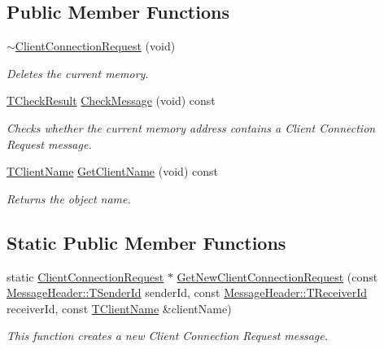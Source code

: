 \subsection*{Public Member Functions}
\begin{DoxyCompactItemize}
\item 
\hyperlink{class_terra_swarm_1_1_asynchronous_1_1_client_connection_request_a610c90a4ff7b849f86c2ddc962ba1c85}{$\sim$\-Client\-Connection\-Request} (void)
\begin{DoxyCompactList}\small\item\em Deletes the current memory. \end{DoxyCompactList}\item 
\hyperlink{class_terra_swarm_1_1_asynchronous_1_1_client_connection_request_a5c46a6a486f1f74b413e11b919b44d4f}{T\-Check\-Result} \hyperlink{class_terra_swarm_1_1_asynchronous_1_1_client_connection_request_a4454fa8df10870c78049ffb0e8c594f6}{Check\-Message} (void) const 
\begin{DoxyCompactList}\small\item\em Checks whether the current memory address contains a Client Connection Request message. \end{DoxyCompactList}\item 
\hyperlink{class_terra_swarm_1_1_asynchronous_1_1_client_connection_request_a50a16fcfef8eb10d5191b6eaf0723a92}{T\-Client\-Name} \hyperlink{class_terra_swarm_1_1_asynchronous_1_1_client_connection_request_a06ce45d6a43bc6e92437a8f6deb5c09a}{Get\-Client\-Name} (void) const 
\begin{DoxyCompactList}\small\item\em Returns the object name. \end{DoxyCompactList}\end{DoxyCompactItemize}
\subsection*{Static Public Member Functions}
\begin{DoxyCompactItemize}
\item 
static \hyperlink{class_terra_swarm_1_1_asynchronous_1_1_client_connection_request}{Client\-Connection\-Request} $\ast$ \hyperlink{class_terra_swarm_1_1_asynchronous_1_1_client_connection_request_a7325e82c2e6f7f1bb538c287d55ae863}{Get\-New\-Client\-Connection\-Request} (const \hyperlink{class_terra_swarm_1_1_message_header_a516b36855e2aad7cfbf8770f1b42784f}{Message\-Header\-::\-T\-Sender\-Id} sender\-Id, const \hyperlink{class_terra_swarm_1_1_message_header_aa3260702b182b6f88ddbdd3416e98df0}{Message\-Header\-::\-T\-Receiver\-Id} receiver\-Id, const \hyperlink{class_terra_swarm_1_1_asynchronous_1_1_client_connection_request_a50a16fcfef8eb10d5191b6eaf0723a92}{T\-Client\-Name} \&client\-Name)
\begin{DoxyCompactList}\small\item\em This function creates a new Client Connection Request message. \end{DoxyCompactList}\end{DoxyCompactItemize}
